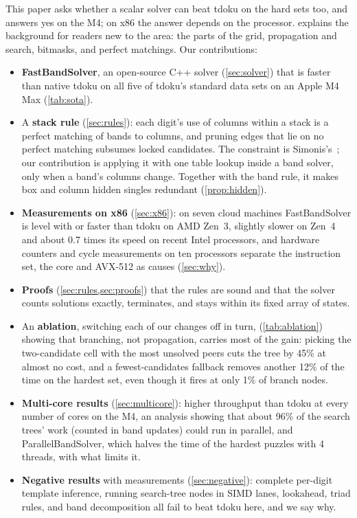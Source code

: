 \documentclass[11pt]{article}
\theoremstyle{definition}
\theoremstyle{plain}
\begin{document}
This paper asks whether a scalar solver can beat tdoku on the hard sets too, and answers yes on the M4; on x86 the
answer depends on the processor. 
explains the background for readers new to the area: the parts of the grid, propagation and search, bitmasks, and
perfect matchings. Our contributions:

\begin{itemize}
\item \textbf{FastBandSolver}, an open-source C++ solver (\cref{sec:solver}) that is faster than native tdoku on all
  five of tdoku's standard data sets on an Apple M4 Max (\cref{tab:sota}).
\item A \textbf{stack rule} (\cref{sec:rules}): each digit's use of columns within a stack is a perfect matching
  of bands to columns, and pruning edges that lie on no perfect matching subsumes locked candidates. The constraint
  is Simonis's~\cite{simonis2005sudoku}; our contribution is applying it with one table lookup inside a band solver,
  only when a band's columns change. Together with the band rule, it makes box and column hidden singles redundant
  (\cref{prop:hidden}).
\item \textbf{Measurements on x86} (\cref{sec:x86}): on seven cloud machines FastBandSolver is level with or
  faster than tdoku on AMD Zen~3, slightly slower on Zen~4 and about 0.7 times its speed on recent Intel processors,
  and hardware counters and cycle measurements on ten processors separate the instruction set, the core and
  AVX-512 as causes (\cref{sec:why}).
\item \textbf{Proofs} (\cref{sec:rules,sec:proofs}) that the rules are sound and that the solver counts solutions
  exactly, terminates, and stays within its fixed array of states.
\item An \textbf{ablation}, switching each of our changes off in turn, (\cref{tab:ablation}) showing that branching, not propagation, carries most of the gain:
  picking the two-candidate cell with the most unsolved peers cuts the tree by 45\% at almost no cost, and a
  fewest-candidates fallback removes another 12\% of the time on the hardest set, even though it fires at only 1\%
  of branch nodes.
\item \textbf{Multi-core results} (\cref{sec:multicore}): higher throughput than tdoku at every number of cores on the M4, an analysis showing that about 96\% of the search trees' work (counted in band updates) could run in parallel, and ParallelBandSolver, which halves the time
  of the hardest puzzles with 4 threads, with what limits it.
\item \textbf{Negative results} with measurements (\cref{sec:negative}): complete per-digit template inference,
  running search-tree nodes in SIMD lanes, lookahead, triad rules, and band decomposition all fail to beat tdoku
  here, and we say why.
\end{itemize}
\end{document}
